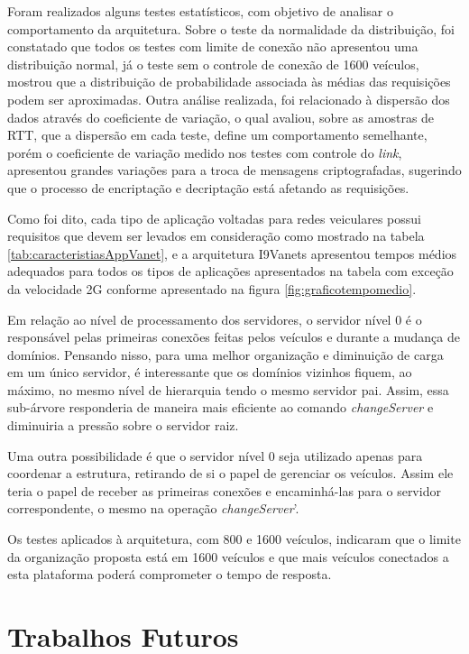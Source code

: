 \documentclass[
	12pt,				%
	oneside,			%
	a4paper,			%
	english,			%
	brazil				%
	]{abntex2ppgsi}
\begin{document}
Foram realizados alguns testes estatísticos, com objetivo de analisar o comportamento da arquitetura. Sobre o teste da normalidade da distribuição, foi constatado que todos os testes com limite de conexão não apresentou uma distribuição normal, já o teste sem o controle de conexão de 1600 veículos,  mostrou que a distribuição de probabilidade associada às médias das requisições podem ser aproximadas. Outra análise realizada, foi relacionado à dispersão dos dados através do coeficiente de variação, o qual avaliou, sobre as amostras de RTT, que a dispersão em cada teste,  define um comportamento semelhante, porém o coeficiente de variação medido nos testes com controle do \textit{link}, apresentou grandes variações para a troca de mensagens criptografadas, sugerindo que o processo de encriptação e decriptação está afetando as requisições.

Como foi dito, cada tipo de aplicação voltadas para redes veiculares possui requisitos que devem ser levados em consideração como mostrado na tabela \ref{tab:caracteristiasAppVanet}, e a arquitetura I9Vanets apresentou tempos médios adequados para todos os tipos de aplicações apresentados na tabela com exceção da velocidade 2G conforme apresentado na figura \ref{fig:graficotempomedio}.

Em relação ao nível de processamento dos servidores, o servidor nível 0 é o responsável pelas primeiras conexões feitas pelos veículos e durante a mudança de domínios. Pensando nisso, para uma melhor organização e diminuição de carga em um único servidor, é interessante que os domínios vizinhos fiquem, ao máximo, no mesmo nível de hierarquia tendo o mesmo servidor pai. Assim, essa sub-árvore responderia de maneira mais eficiente ao comando \textit{changeServer} e diminuiria a pressão sobre o servidor raiz.

Uma outra possibilidade é que o servidor nível 0 seja utilizado apenas para coordenar a estrutura, retirando de si o papel de gerenciar os veículos. Assim ele teria o papel de receber as primeiras conexões  e encaminhá-las para o servidor correspondente, o mesmo na operação \textit{changeServer}'.

Os testes aplicados à arquitetura, com 800 e 1600 veículos, indicaram que o limite da organização proposta está em 1600 veículos e que mais veículos conectados a esta plataforma poderá comprometer o tempo de resposta. 

\section{Trabalhos Futuros}
\end{document}
